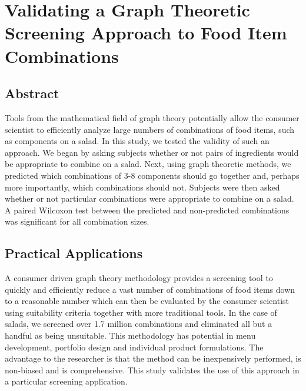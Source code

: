 \chapter{Validating a Graph Theoretic Screening Approach to Food Item Combinations}
\section{Abstract}
Tools from the mathematical field of graph theory potentially allow the consumer scientist to  efficiently analyze large numbers of combinations of food items, such as components on a salad.  In this study, we tested the validity of such an approach.  We began by asking subjects whether or not pairs of ingredients would be appropriate to combine on a salad.  Next, using graph theoretic methods, we predicted which combinations of 3-8 components should go together and, perhaps more importantly, which combinations should not.  Subjects were then asked whether or not particular combinations were appropriate to combine on a salad.  A paired Wilcoxon test between the predicted and non-predicted combinations was significant for all combination sizes.  

\section{Practical Applications}
A consumer driven graph theory methodology provides a screening tool to quickly and efficiently reduce a vast number of combinations of food items down to a reasonable number which can then be evaluated by the consumer scientist using suitability criteria together with more traditional tools.  In the case of salads, we screened over 1.7 million combinations and eliminated all but a handful as being unsuitable.  This methodology has potential in menu development, portfolio design and individual product formulations.  The advantage to the researcher is that the method can be inexpensively performed, is non-biased and is comprehensive.  This study validates the use of this approach in a particular screening application.


